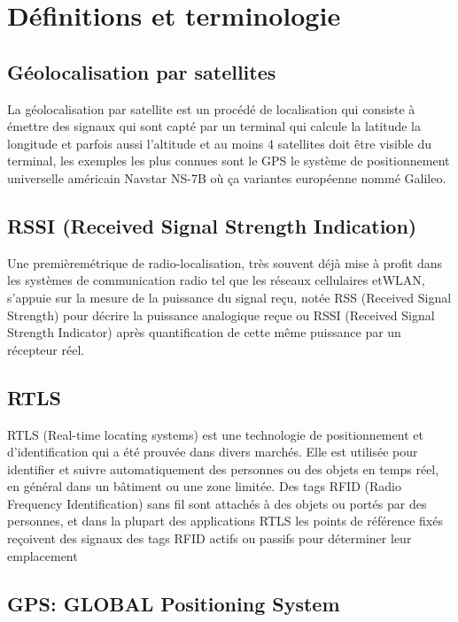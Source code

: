 \documentclass[12pt,a4paper]{report}
\begin{document}
\section{Définitions et terminologie }

\subsection{Géolocalisation par satellites}

La géolocalisation par satellite est un procédé de localisation qui consiste à émettre des signaux qui sont capté par un terminal qui calcule la latitude la longitude et parfois aussi l'altitude et au moins 4 satellites doit être visible du terminal, les exemples les plus connues sont le GPS le système de positionnement universelle américain Navstar NS-7B où ça variantes européenne nommé Galileo.

\subsection{RSSI (Received Signal Strength Indication)}

Une premièremétrique de radio-localisation, très souvent déjà mise à profit dans les systèmes de communication radio tel que les réseaux cellulaires etWLAN, s’appuie sur la mesure de la puissance du signal reçu, notée RSS (Received Signal Strength) pour décrire la puissance analogique reçue ou RSSI (Received Signal Strength Indicator) après quantification de cette même puissance par un récepteur réel.\cite{PHD:rssi}

\subsection{RTLS}

RTLS (Real-time locating systems) est une technologie de positionnement et d'identification qui a été prouvée dans divers marchés. Elle est utilisée pour identifier et suivre automatiquement des personnes ou des objets en temps réel, en général dans un bâtiment ou une zone limitée. Des tags RFID (Radio Frequency Identification) sans fil sont attachés à des objets ou portés par des personnes, et dans la plupart des applications RTLS les points de référence fixés reçoivent des signaux des tags RFID actifs ou passifs pour déterminer leur emplacement\cite{rtls}


\subsection{GPS: GLOBAL Positioning System}
\end{document}
